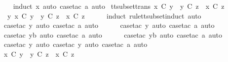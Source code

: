 \begin{isabellebody}
%
\isadelimproof
\ \ %
\endisadelimproof
%
\isatagproof
{}\isamarkupfalse%
\ {\isacharparenleft}induct\ x{\isacharcomma}\ auto{\isacharcomma}\ case{\isacharunderscore}tac\ a{\isacharcomma}\ auto{\isacharparenright}%
\endisatagproof
{\isafoldproof}%
%
\isadelimproof
\isanewline
%
\endisadelimproof
\isanewline
{}\isamarkupfalse%
\ tt{\isacharunderscore}subset{\isacharunderscore}trans{\isacharcolon}\ {\isachardoublequoteopen}x\ {\isasymsubseteq}\isactrlsub C\ y\ {\isasymLongrightarrow}\ y\ {\isasymsubseteq}\isactrlsub C\ z\ {\isasymLongrightarrow}\ x\ {\isasymsubseteq}\isactrlsub C\ z{\isachardoublequoteclose}\isanewline
%
\isadelimproof
%
\endisadelimproof
%
\isatagproof
{}\isamarkupfalse%
\ {\isacharminus}\isanewline
\ \ \isamarkupfalse%
\ {\isachardoublequoteopen}{\isasymexists}\ y{\isachardot}\ x\ {\isasymsubseteq}\isactrlsub C\ y\ {\isasymand}\ y\ {\isasymsubseteq}\isactrlsub C\ z\ {\isasymLongrightarrow}\ x\ {\isasymsubseteq}\isactrlsub C\ z{\isachardoublequoteclose}\isanewline
\ \ \ \ \isamarkupfalse%
\ {\isacharparenleft}induct\ rule{\isacharcolon}tt{\isacharunderscore}subset{\isachardot}induct{\isacharcomma}\ auto{\isacharparenright}\isanewline
\ \ \ \ \isamarkupfalse%
\ {\isacharparenleft}case{\isacharunderscore}tac\ y{\isacharcomma}\ auto{\isacharcomma}\ case{\isacharunderscore}tac\ a{\isacharcomma}\ auto{\isacharparenright}\isanewline
\ \ \ \ \isamarkupfalse%
\ {\isacharparenleft}case{\isacharunderscore}tac\ y{\isacharcomma}\ auto{\isacharcomma}\ case{\isacharunderscore}tac\ a{\isacharcomma}\ auto{\isacharparenright}\isanewline
\ \ \ \ \isamarkupfalse%
\ {\isacharparenleft}case{\isacharunderscore}tac\ yb{\isacharcomma}\ auto{\isacharcomma}\ case{\isacharunderscore}tac\ a{\isacharcomma}\ auto{\isacharparenright}\isanewline
\ \ \ \ \isamarkupfalse%
\ {\isacharparenleft}case{\isacharunderscore}tac\ yb{\isacharcomma}\ auto{\isacharcomma}\ case{\isacharunderscore}tac\ a{\isacharcomma}\ auto{\isacharparenright}\isanewline
\ \ \ \ \isamarkupfalse%
\ {\isacharparenleft}case{\isacharunderscore}tac\ y{\isacharcomma}\ auto{\isacharcomma}\ case{\isacharunderscore}tac\ y{\isacharcomma}\ auto{\isacharcomma}\ case{\isacharunderscore}tac\ a{\isacharcomma}\ auto{\isacharparenright}{\isacharplus}\isanewline
\ \ \ \ \isamarkupfalse%
\ \ \isanewline
\ \ \isamarkupfalse%
\ \isamarkupfalse%
\ {\isachardoublequoteopen}x\ {\isasymsubseteq}\isactrlsub C\ y\ {\isasymLongrightarrow}\ y\ {\isasymsubseteq}\isactrlsub C\ z\ {\isasymLongrightarrow}\ x\ {\isasymsubseteq}\isactrlsub C\ z{\isachardoublequoteclose}\isanewline

\end{isabellebody}
